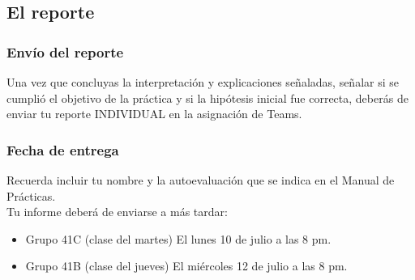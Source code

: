\documentclass[14pt]{beamer}
\begin{document}
\subsection{El reporte}

\begin{frame}
\frametitle{Envío del reporte}
Una vez que concluyas la interpretación y explicaciones señaladas, señalar si se cumplió el objetivo de la práctica y si la hipótesis inicial fue correcta, \pause deberás de enviar tu reporte INDIVIDUAL en la asignación de Teams.
\end{frame}
\begin{frame}
\frametitle{Fecha de entrega}
Recuerda incluir tu nombre y la autoevaluación que se indica en el Manual de Prácticas.
\\
\bigskip
\pause
Tu informe deberá de enviarse a más tardar:
\begin{itemize}
\item Grupo 41C (clase del martes) El lunes 10 de julio a las 8 pm.
\item Grupo 41B (clase del jueves) El miércoles 12 de julio a las 8 pm.
\end{itemize}
\end{frame}
\end{document}
